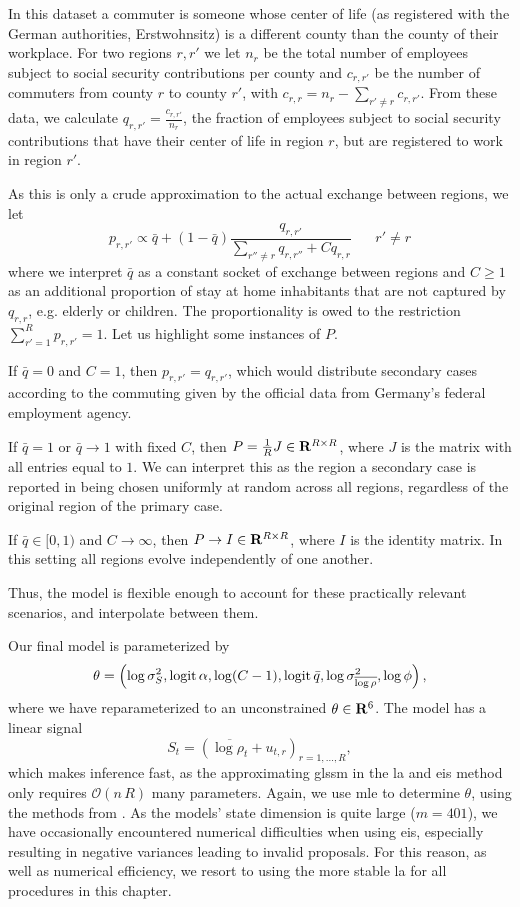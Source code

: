 In this dataset a commuter is someone whose center of life (as registered with the German authorities, \glqq{}Erstwohnsitz\grqq{}) is a different county than the county of their workplace.
For two regions $r,r'$ we let $n_{r}$ be the total number of employees subject to social security contributions per county and $c_{r,r'}$ be the number of commuters from county $r$ to county $r'$, with $c_{r,r} = n_{r} - \sum_{r'\neq r} c_{r,r'}$.
From these data, we calculate $q_{r,r'} = \frac{c_{r,r'}}{n_{r}}$, the fraction of employees subject to social security contributions that have their center of life in region $r$, but are registered to work in region $r'$. 

As this is only a crude approximation to the actual exchange between regions, we let
$$
    p_{r,r'} \propto \bar q + (1- \bar q) \frac{q_{r,r'}}{\sum_{r'' \neq r} q_{r,r''} + C q_{r,r}} \phantom{......} r' \neq r
$$
where we interpret $\bar q$ as a constant socket of exchange between regions and $C \geq 1$ as an additional proportion of stay at home inhabitants that are not captured by $q_{r,r}$, e.g. elderly or children. The proportionality is owed to the restriction $\sum_{r' = 1}^R p_{r,r'} = 1$. Let us highlight some instances of $P$.  

If $\bar q = 0$ and $C = 1$, then $p_{r,r'} = q_{r,r'}$, which would distribute secondary cases according to the commuting given by the official data from Germany's federal employment agency. 

If $\bar q = 1$ or $\bar q \to 1$ with fixed $C$, then $P = \frac{1}{R}J\in\mathbf R^{R\times R}$, where $J$ is the matrix with all entries equal to $1$. We can interpret this as the region a secondary case is reported in being chosen uniformly at random across all regions, regardless of the original region of the primary case. 

If $\bar q \in [0,1)$ and $C \to \infty$, then $P \to I\in\mathbf R^{R \times R}$, where $I$ is the identity matrix. In this setting all regions evolve independently of one another.

Thus, the model is flexible enough to account for these practically relevant scenarios, and interpolate between them.

Our final model is parameterized by
$$
    \theta = \left( \log \sigma^{2}_S, \operatorname{logit} \alpha, \log (C - 1), \operatorname{logit} \bar q, \log \sigma^{2}_{\overline{\log \rho}}, \log \phi\right),
$$
where we have reparameterized to an unconstrained $\theta \in \mathbf R^{6}$. The model has a linear signal 
$$
    S_{t} = \left(\overline{\log \rho_{t}} + u_{t,r}\right)_{r = 1, \dots, R},
$$
which makes inference fast, as the approximating \gls{glssm} in the \gls{la} and \gls{eis} method only requires $\mathcal O(n\,R)$ many parameters. Again, we use \gls{mle} to determine $\theta$, using the methods from . As the models' state dimension is quite large ($m = 401$), we have occasionally encountered numerical difficulties when using \acrshort{eis}, especially resulting in negative variances leading to invalid proposals. For this reason, as well as numerical efficiency, we resort to using the more stable \gls{la} for all procedures in this chapter.


